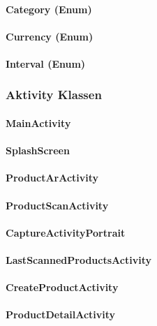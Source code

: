 \documentclass{scrartcl}
\begin{document}
\paragraph{Category (Enum)}

\paragraph{Currency (Enum)}

\paragraph{Interval (Enum)}

\subsubsection{Aktivity Klassen}

\paragraph{MainActivity}

\paragraph{SplashScreen}

\paragraph{ProductArActivity}

\paragraph{ProductScanActivity}

\paragraph{CaptureActivityPortrait}

\paragraph{LastScannedProductsActivity}

\paragraph{CreateProductActivity}

\paragraph{ProductDetailActivity}
\end{document}

